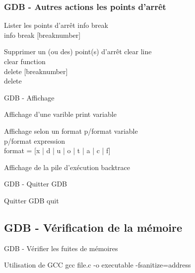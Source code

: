 \documentclass[8pt]{beamer}
\begin{document}
\begin{frame}
\frametitle{GDB - Autres actions les points d'arrêt}

\begin{block}{Lister les points d'arrêt}
	info break\\
	info break [breaknumber]
\end{block}

\begin{block}{Supprimer un (ou des) point(s) d'arrêt}
	clear line\\
	clear function\\
	delete [breaknumber]\\
	delete\\
\end{block}

\end{frame}


\begin{frame}{GDB - Affichage}

\begin{block}{Affichage d'une varible}
	print variable
\end{block}


\begin{block}{Affichage selon un format}
	p/format variable\\
	p/format expression\\
	format = [x | d | u | o | t | a | c | f]
\end{block}

\begin{block}{Affichage de la pile d'exécution}
	backtrace
\end{block}

\end{frame}


\begin{frame}{GDB - Quitter GDB}
	\begin{block}{Quitter GDB}
		quit
	\end{block}
\end{frame}


\subsection{GDB - Vérification de la mémoire} %
\label{sub:gdb_v_rification_de_la_m_moire}

\begin{frame}{GDB - Vérifier les fuites de mémoires}
\begin{block}{Utilisation de GCC}
	gcc file.c -o executable -fsanitize=address
\end{block}
\end{frame}
\end{document}
